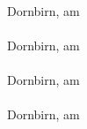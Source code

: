 \noindent
\begin{minipage}[t]{0.35\textwidth}
\centering
\underline{\hspace{5cm}} \\
\vspace{-0.4\baselineskip}
Dornbirn, am \\
\vspace{0.7\baselineskip}
\underline{\hspace{5cm}} \\
\vspace{-0.4\baselineskip}
Dornbirn, am \\
\vspace{0.7\baselineskip}
\underline{\hspace{5cm}} \\
\vspace{-0.4\baselineskip}
Dornbirn, am \\
\vspace{0.7\baselineskip}
\underline{\hspace{5cm}} \\
\vspace{-0.4\baselineskip}
Dornbirn, am \\
\end{minipage}
\hfill
\begin{minipage}[t]{0.55\textwidth}
\centering
\underline{\hspace{7cm}} \\
\vspace{-0.4\baselineskip}
\fenkart \\
\vspace{0.7\baselineskip}
\underline{\hspace{7cm}} \\
\vspace{-0.4\baselineskip}
\mangeng \\
\vspace{0.7\baselineskip}
\underline{\hspace{7cm}} \\
\vspace{-0.4\baselineskip}
\pezze \\
\vspace{0.7\baselineskip}
\underline{\hspace{7cm}} \\
\vspace{-0.4\baselineskip}
\schneider \\
\end{minipage}

